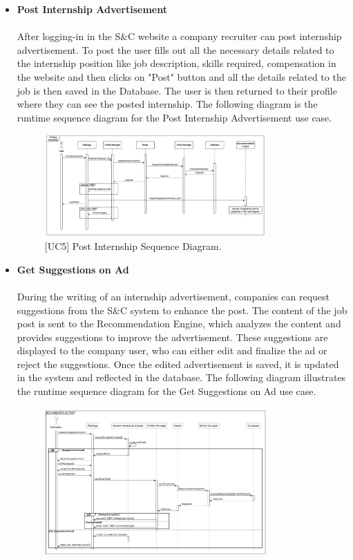 \begin{itemize}
\begin{figure}[H]
    \caption{\label{fig:metamodel9}[UC4] Get suggestion on CV Sequence Diagram.}
    \end{figure}
    \clearpage
    \item \textbf{Post Internship Advertisement} \\ \\
    After logging-in in the S\&C website a company recruiter can post internship advertisement. To post the user fills out all the necessary details related to the internship position like job description, skills required, compensation in the website and then clicks on "Post" button and all the details related to the job is then saved in the Database. The user is then returned to their profile where they can see the posted internship. The following diagram is the runtime sequence diagram for the Post Internship Advertisement use case.
    \begin{figure}[H]
    \centering
    \includegraphics[width=0.8\textwidth]{Images/Posting_Internship_Sequence_Diagram.png}
    \caption{\label{fig:metamodel9}[UC5] Post Internship Sequence Diagram.}
    \end{figure}
    \clearpage
    \item \textbf{Get Suggestions on Ad} \\ \\
    During the writing of an internship advertisement, companies can request suggestions from the S\&C system to enhance the post. The content of the job post is sent to the Recommendation Engine, which analyzes the content and provides suggestions to improve the advertisement. These suggestions are displayed to the company user, who can either edit and finalize the ad or reject the suggestions. Once the edited advertisement is saved, it is updated in the system and reflected in the database. The following diagram illustrates the runtime sequence diagram for the Get Suggestions on Ad use case.
    \begin{figure}[H]
    \centering
    \includegraphics[width=0.8\textwidth]{Images/Internship_Suggestion_Sequence_Diagram.png}

\end{figure}
\end{itemize}
